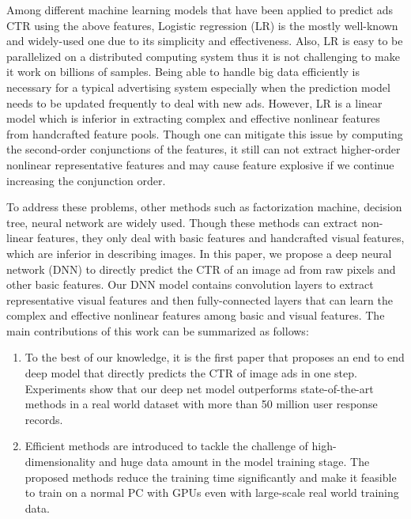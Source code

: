 \documentclass{sig-alternate}
\begin{document}
Among different machine learning models that have been applied to predict ads CTR using the above features, Logistic regression (LR) is the mostly well-known and widely-used one due to its simplicity and effectiveness. Also, LR is easy to be parallelized on a distributed computing system thus it is not challenging to make it work on billions of samples. Being able to handle big data efficiently is necessary for a typical advertising system especially when the prediction model needs to be updated frequently to deal with new ads. However, LR is a linear model which is inferior in extracting complex and effective nonlinear features from handcrafted feature pools. Though one can mitigate this issue by computing the second-order conjunctions of the features, it still can not extract higher-order nonlinear representative features and may cause feature explosive if we continue increasing the conjunction order. %

To address these problems, other methods such as factorization machine, decision tree, neural network are widely used. Though these methods can extract non-linear features, they only deal with basic features and handcrafted visual features, which are inferior in describing images. In this paper, we propose a deep neural network (DNN) to directly predict the CTR of an image ad from raw pixels and other basic features. Our DNN model contains convolution layers to extract representative visual features and then fully-connected layers that can learn the complex and effective nonlinear features among basic and visual features. The main contributions of this work can be summarized as follows:
\begin{enumerate}
	\item To the best of our knowledge, it is the first paper that proposes an end to end deep model that  directly predicts the CTR of image ads in one step. Experiments show that our deep net model outperforms state-of-the-art methods in a real world dataset with more than 50 million user response records. 
	\item Efficient methods are introduced to tackle the challenge of  high-dimensionality and huge data amount in the model training stage. The proposed methods reduce the training time significantly and make it feasible to train on a normal PC with GPUs even with large-scale real world training data.
\end{enumerate}
\end{document}
